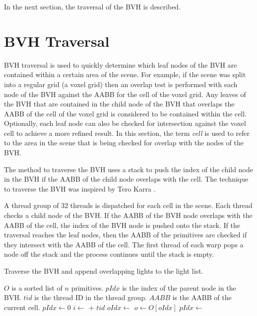 In the next section, the traversal of the BVH is described.

\section{BVH Traversal}

BVH traversal is used to quickly determine which leaf nodes of the BVH are contained within a certain area of the scene. For example, if the scene was split into a regular grid (a voxel grid) then an overlap test is performed with each node of the BVH against the AABB for the cell of the voxel grid. Any leaves of the BVH that are contained in the child node of the BVH that overlaps the AABB of the cell of the voxel grid is considered to be contained within the cell. Optionally, each leaf node can also be checked for intersection against the voxel cell to achieve a more refined result. In this section, the term \emph{cell} is used to refer to the area in the scene that is being checked for overlap with the nodes of the BVH.

The method to traverse the BVH uses a stack to push the index of the child node in the BVH if the AABB of the child node overlaps with the cell. The technique to traverse the BVH was inspired by Tero Karra \parencite{24_karras_2012}.

A thread group of 32 threads is dispatched for each cell in the scene. Each thread checks a child node of the BVH. If the AABB of the BVH node overlaps with the AABB of the cell, the index of the BVH node is pushed onto the stack. If the traversal reaches the leaf nodes, then the AABB of the primitives are checked if they intersect with the AABB of the cell. The first thread of each warp pops a node off the stack and the process continues until the stack is empty.

\begin{algorithm}[H]
\caption{Traverse the BVH and append overlapping lights to the light list.}
\label{alg:TraverseBVH}
\begin{algorithmic}[1]
\Require $O$ is a sorted list of $n$ primitives.
\Require $pIdx$ is the index of the parent node in the BVH.
\Require $tid$ is the thread ID in the thread group.
\Require $AABB$ is the AABB of the current cell.
\State $pIdx \gets 0$
\State {}
\EndIf
\Repeat
\State $i \gets$  + $tid$
\State $oIdx \gets$ 
\State $o \gets O[oIdx]$
\State {}
\EndIf
{}
\State {}
\EndIf
{}
\State $pIdx \gets$ 
\EndIf
{}
\EndFunction
\end{algorithmic}
\end{algorithm}


